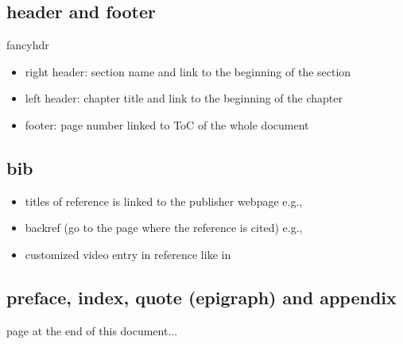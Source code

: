 \subsection{header and footer}
fancyhdr
\begin{itemize}
	\item right header: section name and link to the beginning of the section
	\item left header: chapter title and link to the beginning of the chapter
	\item footer: page number linked to ToC of the whole document
\end{itemize}

\subsection{bib}
\begin{itemize}
	\item titles of reference is linked to the publisher webpage e.g., \cite{kitaev2002classical}
	\item backref (go to the page where the reference is cited) e.g., \cite{childsUniversalComputationQuantum2009}
	\item customized video entry in reference like in \cite{babaiGraphIsomorphismQuasipolynomial2016}
\end{itemize}

\subsection{preface, index, quote (epigraph) and appendix}
 page at the end of this document...



